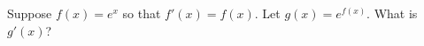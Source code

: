 \documentclass{ximera}
\begin{document}
\begin{problem}
  Suppose $f(x) = e^x$ so that $f'(x) = f(x)$.  Let $g(x) = e^{f(x)}$.  What is $g'(x)$?
  \begin{multipleChoice}
  \end{multipleChoice}
\end{problem}
\end{document}
